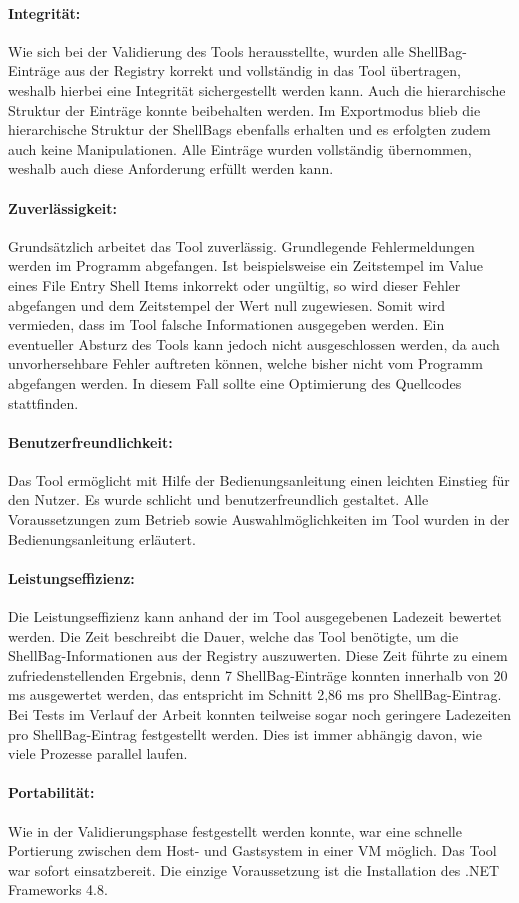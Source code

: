 \paragraph{Integrität:}
Wie sich bei der Validierung des Tools herausstellte, wurden alle ShellBag-Einträge aus der Registry korrekt und vollständig in das Tool übertragen, weshalb hierbei eine Integrität sichergestellt werden kann. Auch die hierarchische Struktur der Einträge konnte beibehalten werden. Im Exportmodus blieb die hierarchische Struktur der ShellBags ebenfalls erhalten und es erfolgten zudem auch keine Manipulationen. Alle Einträge wurden vollständig übernommen, weshalb auch diese Anforderung erfüllt werden kann.

\paragraph{Zuverlässigkeit:}
Grundsätzlich arbeitet das Tool zuverlässig. Grundlegende Fehlermeldungen werden im Programm abgefangen. Ist beispielsweise ein Zeitstempel im Value eines File Entry Shell Items inkorrekt oder ungültig, so wird dieser Fehler abgefangen und dem Zeitstempel der Wert null zugewiesen. Somit wird vermieden, dass im Tool falsche Informationen ausgegeben werden. Ein eventueller Absturz des Tools kann jedoch nicht ausgeschlossen werden, da auch unvorhersehbare Fehler auftreten können, welche bisher nicht vom Programm abgefangen werden. In diesem Fall sollte eine Optimierung des Quellcodes stattfinden.

\paragraph{Benutzerfreundlichkeit:}
Das Tool ermöglicht mit Hilfe der Bedienungsanleitung einen leichten Einstieg für den Nutzer. Es wurde schlicht und benutzerfreundlich gestaltet. Alle Voraussetzungen zum Betrieb sowie Auswahlmöglichkeiten im Tool wurden in der Bedienungsanleitung erläutert.

\paragraph{Leistungseffizienz:}
Die Leistungseffizienz kann anhand der im Tool ausgegebenen Ladezeit bewertet werden. Die Zeit beschreibt die Dauer, welche das Tool benötigte, um die ShellBag-Informationen aus der Registry auszuwerten. Diese Zeit führte zu einem zufriedenstellenden Ergebnis, denn 7 ShellBag-Einträge konnten innerhalb von 20 ms ausgewertet werden, das entspricht im Schnitt 2,86 ms pro ShellBag-Eintrag. Bei Tests im Verlauf der Arbeit konnten teilweise sogar noch geringere Ladezeiten pro ShellBag-Eintrag festgestellt werden. Dies ist immer abhängig davon, wie viele Prozesse parallel laufen.

\paragraph{Portabilität:}
Wie in der Validierungsphase festgestellt werden konnte, war eine schnelle Portierung zwischen dem Host- und Gastsystem in einer VM möglich. Das Tool war sofort einsatzbereit. Die einzige Voraussetzung ist die Installation des .NET Frameworks 4.8.

